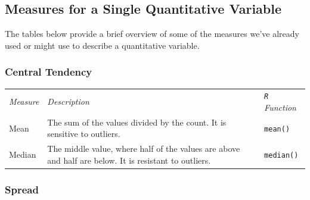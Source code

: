 \documentclass[
  letterpaper,
]{book}
\begin{document}
\hypertarget{measures-for-a-single-quantitative-variable}{%
\subsection{Measures for a Single Quantitative
Variable}\label{measures-for-a-single-quantitative-variable}}

The tables below provide a brief overview of some of the measures we've
already used or might use to describe a quantitative variable.

\hypertarget{central-tendency}{%
\subsubsection*{Central Tendency}\label{central-tendency}}

\begin{longtable}[]{@{}
  >{\raggedright\arraybackslash}p{}
  >{\raggedright\arraybackslash}p{}
  >{\raggedright\arraybackslash}p{}@{}}
\toprule\noalign{}
\endhead
\bottomrule\noalign{}
\endlastfoot
\emph{Measure} & \emph{Description} & \emph{\texttt{R} Function} \\
Mean & The sum of the values divided by the count. It is sensitive to
outliers. & \texttt{mean()} \\
Median & The middle value, where half of the values are above and half
are below. It is resistant to outliers. & \texttt{median()} \\
\end{longtable}

\hypertarget{spread}{%
\subsubsection*{Spread}\label{spread}}
\end{document}
